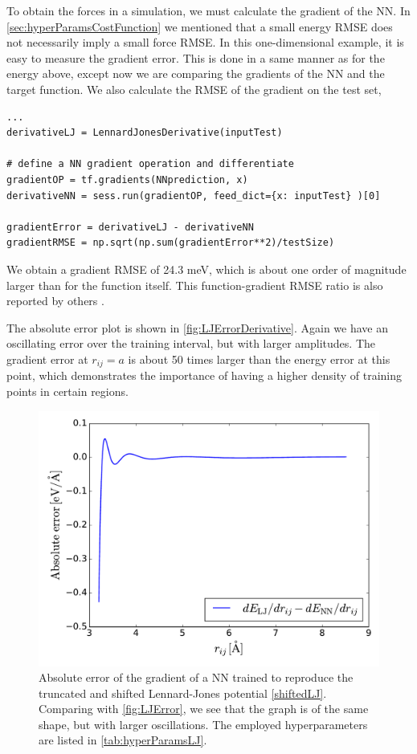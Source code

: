 \documentclass[twoside,english]{uiofysmaster}
\begin{document}
To obtain the forces in a simulation, we must calculate the gradient of the NN. 
In \autoref{sec:hyperParamsCostFunction} we mentioned that a small energy RMSE does not 
necessarily imply a small force RMSE. In this one-dimensional example, it is easy to measure the gradient error. 
This is done in a same manner as for the energy above, except now we are comparing the gradients of the NN and the target function. 
We also calculate the RMSE of the gradient on the test set,
\begin{verbatim}
...
derivativeLJ = LennardJonesDerivative(inputTest)

# define a NN gradient operation and differentiate
gradientOP = tf.gradients(NNprediction, x)
derivativeNN = sess.run(gradientOP, feed_dict={x: inputTest} )[0]

gradientError = derivativeLJ - derivativeNN
gradientRMSE = np.sqrt(np.sum(gradientError**2)/testSize)
\end{verbatim}
We obtain a gradient RMSE of 24.3 meV, which is about one order of magnitude larger than for the function itself. 
This function-gradient RMSE ratio is also reported by others \cite{Natarajan16,Artrith12}. 

The absolute error plot is shown in \autoref{fig:LJErrorDerivative}. 
Again we have an oscillating error over the training interval, but with 
larger amplitudes. The gradient error at $r_{ij} = a$ is about 50 times larger than the energy error at this point, which  
demonstrates the importance of having a higher density of training points in certain regions. 
\begin{figure}
\centering
  \includegraphics[width = 0.7\linewidth]{Figures/Implementation/LJErrorDerivative.pdf}
  \caption{Absolute error of the gradient of a NN trained to reproduce the truncated and shifted Lennard-Jones 
           potential \eqref{shiftedLJ}. Comparing with \autoref{fig:LJError}, we see that the graph is of the same shape, 
           but with larger oscillations. The employed hyperparameters are listed in \autoref{tab:hyperParamsLJ}. }
  \label{fig:LJErrorDerivative}
\end{figure}
\end{document}
